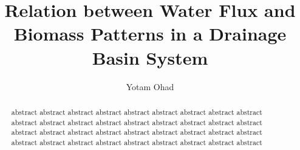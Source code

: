 \documentclass{article}
\title{Relation between Water Flux and Biomass Patterns in a Drainage Basin System}
\author{Yotam Ohad}
\begin{document}
\maketitle

\begin{abstract}
    abstract abstract abstract abstract abstract abstract abstract abstract abstract abstract abstract abstract abstract abstract abstract abstract abstract abstract abstract abstract abstract abstract abstract abstract abstract abstract abstract abstract abstract abstract abstract abstract abstract abstract abstract abstract 
\end{abstract}
\begin{multicols}{2}




\end{multicols}
\end{document}
